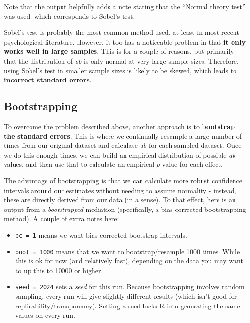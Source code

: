 \documentclass[
]{book}
\providecommand{\tightlist}{%
  \setlength{\itemsep}{0pt}\setlength{\parskip}{0pt}}
\begin{document}
Note that the output helpfully adds a note stating that the ``Normal theory test'' was used, which corresponds to Sobel's test.

Sobel's test is probably the most common method used, at least in most recent psychological literature. However, it too has a noticeable problem in that \textbf{it only works well in large samples}. This is for a couple of reasons, but primarily that the distribution of \emph{ab} is only normal at very large sample sizes. Therefore, using Sobel's test in smaller sample sizes is likely to be skewed, which leads to \textbf{incorrect standard errors}.

\subsection{Bootstrapping}\label{bootstrapping}

To overcome the problem described above, another approach is to \textbf{bootstrap the standard errors}. This is where we continually resample a large number of times from our original dataset and calculate \emph{ab} for each sampled dataset. Once we do this enough times, we can build an empirical distribution of possible \emph{ab} values, and then use that to calculate an empirical \emph{p}-value for each effect.

The advantage of bootstrapping is that we can calculate more robust confidence intervals around our estimates without needing to assume normality - instead, these are directly derived from our data (in a sense). To that effect, here is an output from a \emph{bootstrapped} mediation (specifically, a bias-corrected bootstrapping method). A couple of extra notes here:

\begin{itemize}
\tightlist
\item
  \texttt{bc\ =\ 1} means we want bias-corrected bootstrap intervals.
\item
  \texttt{boot\ =\ 1000} means that we want to bootstrap/resample 1000 times. While this is ok for now (and relatively fast), depending on the data you may want to up this to 10000 or higher.
\item
  \texttt{seed\ =\ 2024} sets a \emph{seed} for this run. Because bootstrapping involves random sampling, every run will give slightly different results (which isn't good for replicability/transparency). Setting a seed locks R into generating the same values on every run.
\end{itemize}
\end{document}
